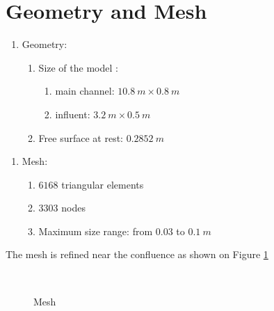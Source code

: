 \section{Geometry and Mesh}
%
\begin{enumerate}
  \item[] Geometry:
  \begin{enumerate}
      \item[\textendash] Size of the model :
      \begin{enumerate}
          \item[\textbullet] main channel: $10.8~m \times 0.8~m$
          \item[\textbullet] influent: $3.2~m \times 0.5~m$
      \end{enumerate}
  \item[\textendash] Free surface at rest: $0.2852~m$
  \end{enumerate}
\end{enumerate}
%
\begin{enumerate}
  \item[] Mesh:
  \begin{enumerate}
      \item[\textendash] $6168$ triangular elements
      \item[\textendash] $3303$ nodes
      \item[\textendash] Maximum size range: from $0.03$ to $0.1~m$
  \end{enumerate}
\end{enumerate}
The mesh is refined near the confluence as shown on Figure \ref{t2d:confluence:mesh}
%
\begin{figure}[H]
  \centering
  \\
  \caption{Mesh}\label{t2d:confluence:mesh}
\end{figure}
%
%
%
